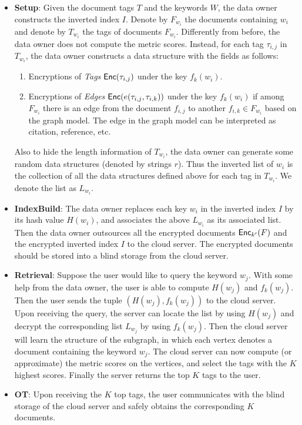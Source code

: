 \documentclass{IEEEtran}
\begin{document}
\begin{itemize}
\item {\bf Setup}: Given the document tags $T$ and the keywords $W$, the data owner constructs the inverted index $I$. Denote by $F_{w_i}$ the documents containing $w_i$ and denote by $T_{w_i}$ the tags of documents $F_{w_i}$. Differently from before, the data owner does not compute the metric scores. Instead, for each tag $\tau_{i,j}$ in $T_{w_i}$, the data owner constructs a data structure with the fields as follows:
	\begin{enumerate}
	\item Encryptions of \emph{Tags} $\textsf{Enc}(\tau_{i,j})$ under the key $f_k(w_i)$.
	\item Encryptions of \emph{Edges} $\textsf{Enc}(e(\tau_{i,j}, \tau_{i,k}))$ under the key $f_k(w_i)$ if among $F_{w_i}$ there is an edge from the document $f_{i,j}$ to another $f_{i,k}\in F_{w_i}$ based on the graph model. The edge in the graph model can be interpreted as citation, reference, etc.
	\end{enumerate}
	Also to hide the length information of $T_{w_i}$, the data owner can generate some random data structures (denoted by strings $r$). 
	Thus the inverted list of $w_i$ is the collection of all the data structures defined above for each tag in $T_{w_i}$. We denote the list as $L_{w_i}$.
\item {\bf IndexBuild}: The data owner replaces each key $w_i$ in the inverted index $I$ by its hash value $H(w_i)$, and associates the above $L_{w_i}$ as its associated list. Then the data owner outsources all the encrypted documents $\textsf{Enc}_{k'}(F)$ and the encrypted inverted index $I$ to the cloud server. The encrypted documents should be stored into a blind storage from the cloud server.
\item {\bf Retrieval}: Suppose the user would like to query the keyword $w_j$. With some help from the data owner, the user is able to compute $H(w_j)$ and $f_k(w_j)$. Then the user sends the tuple $(H(w_j), f_k(w_j))$ to the cloud server. Upon receiving the query, the server can locate the list by using $H(w_j)$ and decrypt the corresponding list $L_{w_j}$ by using $f_k(w_j)$. Then the cloud server will learn the structure of the subgraph, in which each vertex denotes a document containing the keyword $w_j$. The cloud server can now compute (or approximate) the metric scores on the vertices, and select the tags with the $K$ highest scores. Finally the server returns the top $K$ tags to the user.
\item {\bf OT}: Upon receiving the $K$ top tags, the user communicates with the blind storage of the cloud server and safely obtains the corresponding $K$ documents.
\end{itemize}
\end{document}
